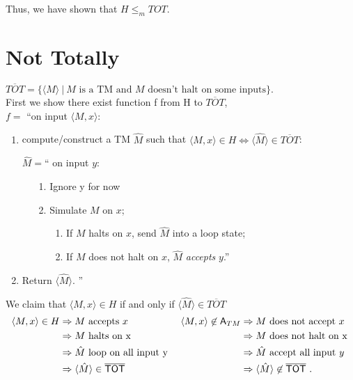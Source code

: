\documentclass[12pt]{article}
\begin{document}
Thus, we have shown that $H \le_m TOT$.


\pagebreak
\section{Not Totally}

$\overline{TOT} =  \{\langle M \rangle ~|~ M \textrm{ is a TM and } M \textrm{ doesn't halt on some inputs}\}.$   \\
First we show there exist function f from H to $\overline{TOT}$,\\
$f=$ ``on input $\langle M,x\rangle$:
\begin{enumerate}
    \item compute/construct a TM $\hat{M}$ such that $\langle M,x \rangle \in H \iff \langle \hat{M} \rangle \in \overline{TOT}$:

$\hat{M}=$`` on input $y$:
\vspace*{-10pt}
\begin{itemize}
\item[1.] Ignore y for now
\item[2.] Simulate $M$ on $x$; 
\begin{enumerate}
    \item[1.] If $M$ halts on $x$, send $\hat{M}$ into a loop state;
    \item[2.] If $M$ does not halt on $x$, $\hat{M}$ \emph{accepts} $y$.''
\end{enumerate}
\end{itemize}
\item Return $\langle \hat{M}\rangle$. ''
\end{enumerate}

We claim that $\langle M, x\rangle \in H$ if and only if $\langle\hat{M}\rangle \in \overline{TOT}$
\begin{align*}
\langle M,x \rangle \in H & \Rightarrow  M \textrm{ accepts $x$} & \langle M,x \rangle \not\in {\sf A}_{TM} & \Rightarrow  M \textrm{ does not accept $x$}\\ 
& \Rightarrow  M \textrm{ halts on x } & & \Rightarrow  {M} \textrm{ does not halt on x }\\
& \Rightarrow  \hat{M} \textrm{ loop on all input y } & & \Rightarrow  \hat{M} \textrm{ accept all input $y$}\\
& \Rightarrow  \langle \hat{M}\rangle \in {\sf \overline{TOT}}& & \Rightarrow \langle \hat{M} \rangle \not \in {\sf \overline{TOT}}~.
\end{align*}
\end{document}
